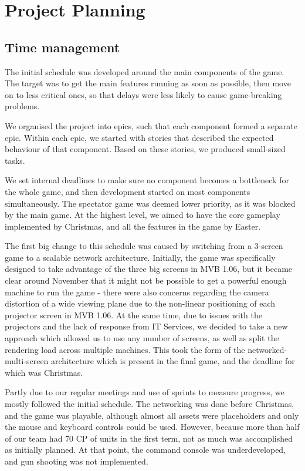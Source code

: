 \documentclass[a4paper,11pt]{article}
\begin{document}
\section{Project Planning}

\subsection{Time management}
The initial schedule was developed around the main components of the game. The target was to get the main features running as soon as possible, then move on to less critical ones, so that delays were less likely to cause game-breaking problems.

We organised the project into epics, such that each component formed a separate epic. Within each epic, we started with stories that described the expected behaviour of that component. Based on these stories, we produced small-sized tasks.

We set internal deadlines to make sure no component becomes a bottleneck for the whole game, and then development started on most components simultaneously. The spectator game was deemed lower priority, as it was blocked by the main game. At the highest level, we aimed to have the core gameplay implemented by Christmas, and all the features in the game by Easter.

The first big change to this schedule was caused by switching from a 3-screen game to a scalable network architecture. Initially, the game was specifically designed to take advantage of the three big screens in MVB 1.06, but it became clear around November that it might not be possible to get a powerful enough machine to run the game - there were also concerns regarding the camera distortion of a wide viewing plane due to the non-linear positioning of each projector screen in MVB 1.06. At the same time, due to issues with the projectors and the lack of response from IT Services, we decided to take a new approach which allowed us to use any number of screens, as well as split the rendering load across multiple machines. This took the form of the networked-multi-screen architecture which is present in the final game, and the deadline for which was Christmas.

Partly due to our regular meetings and use of sprints to measure progress, we mostly followed the initial schedule. The networking was done before Christmas, and the game was playable, although almost all assets were placeholders and only the mouse and keyboard controls could be used. However, because more than half of our team had 70 CP of units in the first term, not as much was accomplished as initially planned. At that point, the command console was underdeveloped, and gun shooting was not implemented.
\end{document}
